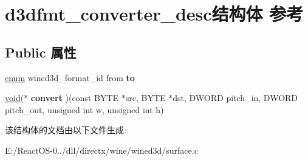 \hypertarget{structd3dfmt__converter__desc}{}\section{d3dfmt\+\_\+converter\+\_\+desc结构体 参考}
\label{structd3dfmt__converter__desc}
\subsection*{Public 属性}
\begin{DoxyCompactItemize}
\item 
\mbox{\label{structd3dfmt__converter__desc_a80070afcca3ea826edbf48b609e1fc6d}} 
\hyperlink{interfaceenum}{enum} wined3d\+\_\+format\+\_\+id from {\bfseries to}
\item 
\mbox{\label{structd3dfmt__converter__desc_a4789df30efabf91936b16e1b669bc52e}} 
\hyperlink{interfacevoid}{void}($\ast$ {\bfseries convert} )(const B\+Y\+TE $\ast$src, B\+Y\+TE $\ast$dst, D\+W\+O\+RD pitch\+\_\+in, D\+W\+O\+RD pitch\+\_\+out, unsigned int w, unsigned int h)
\end{DoxyCompactItemize}


该结构体的文档由以下文件生成\+:\begin{DoxyCompactItemize}
\item 
E\+:/\+React\+O\+S-\/0../dll/directx/wine/wined3d/surface.\+c\end{DoxyCompactItemize}
